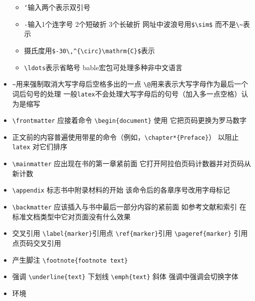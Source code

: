 \documentclass[
]{book}
\begin{document}
\begin{itemize}
  \begin{itemize}
  \item
    \texttt{‘}输入两个表示双引号
  \item
    \texttt{-}输入1个连字号 2个短破折 3个长破折 网址中波浪号用\texttt{\$\textbackslash{}sim\$} 而不是\texttt{\textbackslash{}\textasciitilde{}}表示
  \item
    摄氏度用\texttt{\$-30\textbackslash{},\^{}\{\textbackslash{}circ\}\textbackslash{}mathrm\{C\}\$}表示
  \item
    \texttt{\textbackslash{}ldots}表示省略号 bable宏包可处理多种非中文语言
  \end{itemize}
\item
  \texttt{\textasciitilde{}}用来强制取消大写字母后空格多出的一点 \texttt{\textbackslash{}@}用来表示大写字母作为最后一个词后句号的处理 一般\texttt{latex}不会处理大写字母后的句号（加入多一点空格）认为是缩写
\item
  \texttt{\textbackslash{}frontmatter} 应接着命令 \texttt{\textbackslash{}begin\{document\}} 使用 它把页码更换为罗马数字
\item
  正文前的内容普遍使用带星的命令（例如，\texttt{\textbackslash{}chapter*\{Preface\}}） 以阻止 \texttt{latex} 对它们排序
\item
  \texttt{\textbackslash{}mainmatter} 应出现在书的第一章紧前面 它打开阿拉伯页码计数器并对页码从新计数
\item
  \texttt{\textbackslash{}appendix} 标志书中附录材料的开始 该命令后的各章序号改用字母标记
\item
  \texttt{\textbackslash{}backmatter} 应该插入与书中最后一部分内容的紧前面 如参考文献和索引 在标准文档类型中它对页面没有什么效果
\item
  交叉引用 \texttt{\textbackslash{}label\{marker\}}引用点 \texttt{\textbackslash{}ref\{marker\}}引用 \texttt{\textbackslash{}pageref\{marker\}} 引用点页码交叉引用
\item
  产生脚注 \texttt{\textbackslash{}footnote\{footnote\ text\}}
\item
  强调 \texttt{\textbackslash{}underline\{text\}} 下划线 \texttt{\textbackslash{}emph\{text\}} 斜体 强调中强调会切换字体
\item
  环境


\end{itemize}
\end{document}
